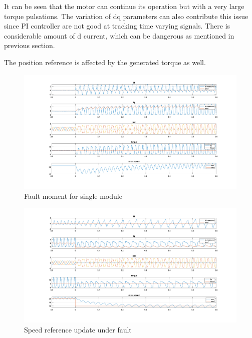 \documentclass{article}
\begin{document}
It can be seen that the motor can continue its operation but with a very large torque pulsations. The variation of dq parameters can also contribute this issue since PI controller are not good at tracking time varying signals. There is considerable amount of d current, which can be dangerous as mentioned in previous section. 

The position reference is affected by the generated torque as well.

\begin{figure}[h!]
\centering
\includegraphics[scale=0.3]{Figures/SingleModule/FaultMoment.png}
\caption{Fault moment for single module}
\label{fig:fault_moment}
\end{figure}

\begin{figure}[h!]
\centering
\includegraphics[scale=0.3]{Figures/SingleModule/SpeedRefUpdateUnderFault.png}
\caption{Speed reference update under fault}
\label{fig:ref_update_under_fault}
\end{figure}
\end{document}
